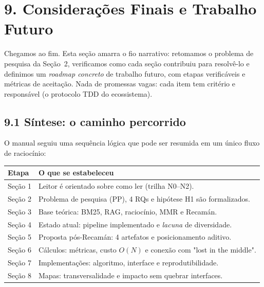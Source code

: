 
\section*{9. Considerações Finais e Trabalho Futuro}

 Chegamos ao fim. Esta seção amarra o fio narrativo: retomamos o problema
de pesquisa da Seção~2, verificamos como cada seção contribuiu para resolvê-lo e
definimos um \emph{roadmap concreto} de trabalho futuro, com etapas verificáveis e
métricas de aceitação. Nada de promessas vagas: cada item tem critério e
responsável (o protocolo TDD do ecossistema).

\subsection*{9.1 Síntese: o caminho percorrido}

 O manual seguiu uma sequência lógica que pode ser resumida em um único
fluxo de raciocínio:

\begin{center}
\begin{tabular}{@{}p{}p{}@{}}
\toprule
\textbf{Etapa} & \textbf{O que se estabeleceu} \\
\midrule
Seção 1 & Leitor é orientado sobre como ler (trilha N0--N2). \\
Seção 2 & Problema de pesquisa (PP), 4 RQs e hipótese H1 são formalizados. \\
Seção 3 & Base teórica: BM25, RAG, raciocínio, MMR e Recamán. \\
Seção 4 & Estado atual: pipeline implementado e \emph{lacuna} de diversidade. \\
Seção 5 & Proposta pós-Recamán: 4 artefatos e posicionamento aditivo. \\
Seção 6 & Cálculos: métricas, custo $O(N)$ e conexão com "lost in the middle". \\
Seção 7 & Implementações: algoritmo, interface e reprodutibilidade. \\
Seção 8 & Mapas: transversalidade e impacto sem quebrar interfaces. \\
\bottomrule
\end{tabular}
\end{center}

